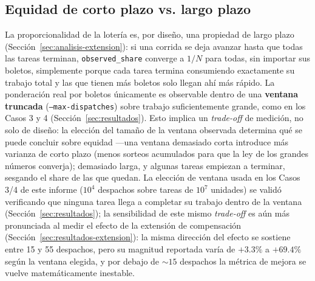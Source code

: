 \subsection{Equidad de corto plazo vs. largo plazo}

La proporcionalidad de la lotería es, por diseño, una propiedad de largo
plazo (Sección~\ref{sec:analisis-extension}): si una corrida se deja
avanzar hasta que todas las tareas terminan, \texttt{observed\_share}
converge a $1/N$ para todas, sin importar sus boletos, simplemente porque
cada tarea termina consumiendo exactamente su trabajo total y las que
tienen más boletos solo llegan ahí más rápido. La ponderación real por
boletos únicamente es observable dentro de una \textbf{ventana truncada}
(\texttt{--max-dispatches}) sobre trabajo suficientemente grande, como en
los Casos 3 y 4 (Sección~\ref{sec:resultados}). Esto implica un
\textit{trade-off} de medición, no solo de diseño: la elección del tamaño de
la ventana observada determina qué se puede concluir sobre equidad ---una
ventana demasiado corta introduce más varianza de corto plazo (menos
sorteos acumulados para que la ley de los grandes números converja);
demasiado larga, y algunas tareas empiezan a terminar, sesgando el share de
las que quedan. La elección de ventana usada en los Casos 3/4 de este
informe ($10^4$ despachos sobre tareas de $10^7$ unidades) se validó
verificando que ninguna tarea llega a completar su trabajo dentro de la
ventana (Sección~\ref{sec:resultados}); la sensibilidad de este mismo
\textit{trade-off} es aún más pronunciada al medir el efecto de la
extensión de compensación (Sección~\ref{sec:resultados-extension}): la
misma dirección del efecto se sostiene entre 15 y 55 despachos, pero su
magnitud reportada varía de $+3.3\%$ a $+69.4\%$ según la ventana elegida,
y por debajo de $\sim 15$ despachos la métrica de mejora se vuelve
matemáticamente inestable.
